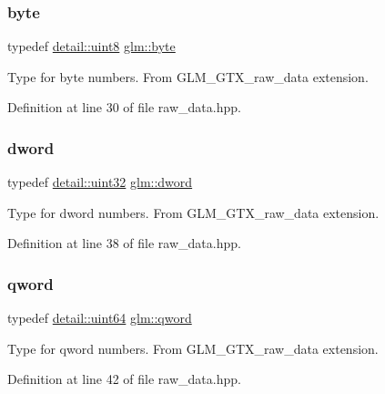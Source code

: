 \subsubsection{\texorpdfstring{byte}{byte}}
{\footnotesize\ttfamily typedef \mbox{\hyperlink{namespaceglm_1_1detail_aef2588f97d090cc19fbbe0c74fe17c8f}{detail\+::uint8}} \mbox{\hyperlink{group__gtx__raw__data_gacd7fe1f2ad60a57f7d7ad4f1e6836efd}{glm\+::byte}}}

Type for byte numbers. From G\+L\+M\+\_\+\+G\+T\+X\+\_\+raw\+\_\+data extension. 

Definition at line 30 of file raw\+\_\+data.\+hpp.

\mbox{\label{group__gtx__raw__data_ga1fc2589df6d44e923cd1820cf14805cf}} 
\subsubsection{\texorpdfstring{dword}{dword}}
{\footnotesize\ttfamily typedef \mbox{\hyperlink{namespaceglm_1_1detail_ade6cfbf377022aaa391af8cd50489222}{detail\+::uint32}} \mbox{\hyperlink{group__gtx__raw__data_ga1fc2589df6d44e923cd1820cf14805cf}{glm\+::dword}}}

Type for dword numbers. From G\+L\+M\+\_\+\+G\+T\+X\+\_\+raw\+\_\+data extension. 

Definition at line 38 of file raw\+\_\+data.\+hpp.

\mbox{\label{group__gtx__raw__data_ga32447af289e879589883c9b7e3be1246}} 
\subsubsection{\texorpdfstring{qword}{qword}}
{\footnotesize\ttfamily typedef \mbox{\hyperlink{namespaceglm_1_1detail_adec4b19bf4982125e122db2fe03c5810}{detail\+::uint64}} \mbox{\hyperlink{group__gtx__raw__data_ga32447af289e879589883c9b7e3be1246}{glm\+::qword}}}

Type for qword numbers. From G\+L\+M\+\_\+\+G\+T\+X\+\_\+raw\+\_\+data extension. 

Definition at line 42 of file raw\+\_\+data.\+hpp.

\mbox{\label{group__gtx__raw__data_ga5617a479d471021b5c773c5e969ba46d}} 
